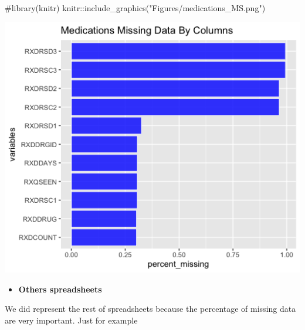 \begin{Schunk}
\begin{Sinput}
#library(knitr)
knitr::include_graphics("Figures/medications_MS.png")
\end{Sinput}


\begin{center}\includegraphics[width=7.15in]{Figures/medications_MS} \end{center}

\end{Schunk}

\begin{itemize}
\tightlist
\item
  \textbf{Others spreadsheets }
\end{itemize}

We did represent the rest of spreadsheets because the percentage of
missing data are very important. Just for example

